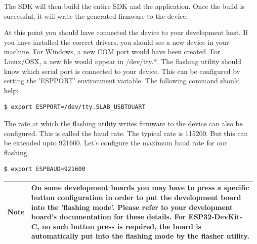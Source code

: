 \documentclass[11pt,fleqn]{book} %
\newcommand{\ksnotebox}[1]{\begin{tabularx}{\textwidth}{ |c|X| }
\hline
\cellcolor{lightgray} \textbf{Note} & #1 \\
\hline
\end{tabularx}} %
\begin{document}
The SDK will then build the entire SDK and the application. Once the build is successful, it will write the generated firmware to the device.

At this point you should have connected the device to your development host. If you have installed the correct drivers, you should see a new device in your machine. For Windows, a new COM port would have been created. For Linux/OSX, a new file would appear in /dev/tty.*. The flashing utility should know which serial port is connected to your device. This can be configured by setting the 'ESPPORT' environment variable. The following command should help:
\begin{verbatim}
$ export ESPPORT=/dev/tty.SLAB_USBTOUART
\end{verbatim}

The rate at which the flashing utility writes firmware to the device can also be configured. This is called the baud rate. The typical rate is 115200. But this can be extended upto 921600. Let's configure the maximum baud rate for our flashing.
\begin{verbatim}
$ export ESPBAUD=921600
\end{verbatim}

\ksnotebox{On some development boards you may have to press a specific button configuration in order to put the development board into the 'flashing mode'. Please refer to your development board's documentation for these details. For ESP32-DevKit-C, no such button press is required, the board is automatically put into the flashing mode by the flasher utility.}
\end{document}
